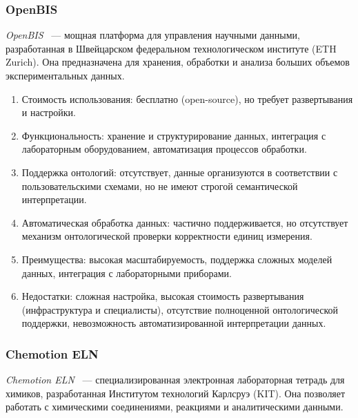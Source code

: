 \subsubsection{OpenBIS}

\textit{OpenBIS}~\cite{ELN:OpenBIS} — мощная платформа для управления научными данными, разработанная в Швейцарском федеральном технологическом институте (ETH Zurich).
Она предназначена для хранения, обработки и анализа больших объемов экспериментальных данных.

\begin{enumerate}
    \item Стоимость использования: бесплатно (open-source), но требует развертывания и настройки.
    \item Функциональность: хранение и структурирование данных, интеграция с лабораторным оборудованием, автоматизация процессов обработки.
    \item Поддержка онтологий: отсутствует, данные организуются в соответствии с пользовательскими схемами, но не имеют строгой семантической интерпретации.
    \item Автоматическая обработка данных: частично поддерживается, но отсутствует механизм онтологической проверки корректности единиц измерения.
    \item Преимущества: высокая масштабируемость, поддержка сложных моделей данных, интеграция с лабораторными приборами.
    \item Недостатки: сложная настройка, высокая стоимость развертывания (инфраструктура и специалисты), отсутствие полноценной онтологической поддержки, невозможность автоматизированной интерпретации данных.
\end{enumerate}

\subsubsection{Chemotion ELN}

\textit{Chemotion ELN}~\cite{ELN:Chemotion} — специализированная электронная лабораторная тетрадь для химиков, разработанная Институтом технологий Карлсруэ (KIT).
Она позволяет работать с химическими соединениями, реакциями и аналитическими данными.

